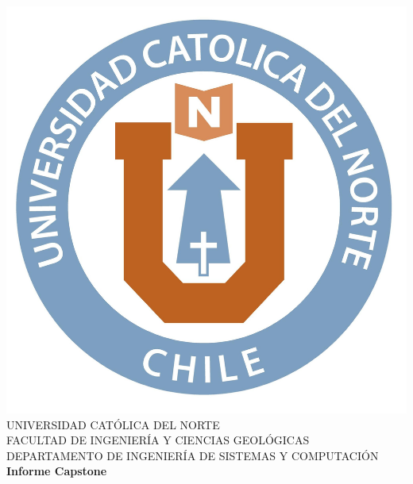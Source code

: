 \documentclass[oneside,12pt, letterpaper, titlepage]{book}
\begin{document}
\sloppy %
\renewcommand{\tablename}{Tabla}
\renewcommand{\listtablename}{Índice de Tablas}
\renewcommand{\listfigurename}{Índice de Figuras}
\setlength{\parindent}{0pt}

\onehalfspace

\begin{titlepage}
\centering
\vspace*{-0.4in}
\includegraphics[scale=0.3]{./images/u.jpg}\\
{\fontsize{14}{14}\selectfont
UNIVERSIDAD CATÓLICA DEL NORTE\\
FACULTAD DE INGENIERÍA Y CIENCIAS GEOLÓGICAS\\
DEPARTAMENTO DE INGENIERÍA DE SISTEMAS Y COMPUTACIÓN\\}
\vspace{2.3in}
{\fontsize{14}{14}\bfseries Informe Capstone\\}
\vspace*{1.5in}

\end{titlepage}
\end{document}
